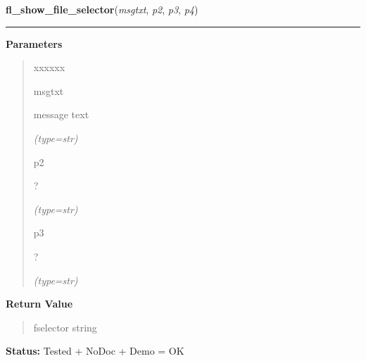 \hspace{.8\funcindent}\begin{boxedminipage}{\funcwidth}

    \raggedright \textbf{fl\_show\_file\_selector}(\textit{msgtxt}, \textit{p2}, \textit{p3}, \textit{p4})

    \vspace{-1.5ex}

    \rule{\textwidth}{0.5\fboxrule}
\setlength{\parskip}{2ex}
\setlength{\parskip}{1ex}
      \textbf{Parameters}
      \vspace{-1ex}

      \begin{quote}
        \begin{Ventry}{xxxxxx}

          \item[msgtxt]

          message text

            {\it (type=str)}

          \item[p2]

          ?

            {\it (type=str)}

          \item[p3]

          ?

            {\it (type=str)}

        \end{Ventry}

      \end{quote}

      \textbf{Return Value}
    \vspace{-1ex}

      \begin{quote}
      fselector string

      \end{quote}

\textbf{Status:} Tested + NoDoc + Demo = OK



    \end{boxedminipage}

    \label{xformslib:flgoodies:fl_set_fselector_fontsize}

    \vspace{0.5ex}

